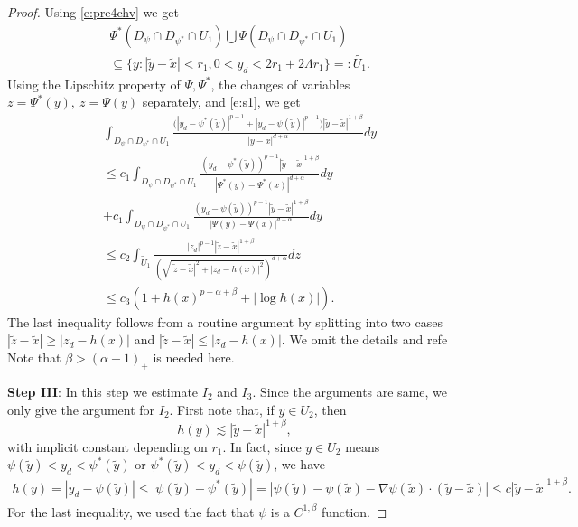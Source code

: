 \documentclass[12pt,a4paper]{amsart}
\numberwithin{equation}{section}
\theoremstyle{plain}
\newcommand{\be}{\beta}
\newcommand{\wt}{\widetilde}
\newcommand{\1}{\mathbbm{1}}
\begin{document}
\begin{proof}
Using \eqref{e:pre4chv} we get
\begin{equation} \label{e:s1}
    \begin{aligned}
& \Psi^*(D_{\psi} \cap D_{\psi^*} \cap U_1) \bigcup \Psi(D_{\psi} \cap D_{\psi^*} \cap U_1) \\
& \subseteq \{y: |\wt y -\wt x|<r_1, 0< y_d < 2r_1 + 2\Lambda r_1\}=: \wt{U_1}.
\end{aligned}
\end{equation}
Using the Lipschitz property of $\Psi, \Psi^*$, the changes of variables $z = \Psi^*(y),\ z = \Psi(y)$ separately, and \eqref{e:s1}, we get
\begin{align*}
& \int_{D_{\psi} \cap D_{\psi^*} \cap U_1} \frac{\big(|y_d - \psi^*(\wt y)|^{p-1} + |y_d - \psi(\wt y)|^{p-1} \big)|\wt y - \wt x|^{1+\beta}}{|y-x|^{d+\alpha}}dy \\
& \le c_1\int_{D_{\psi} \cap D_{\psi^*} \cap U_1} \frac{(y_d - \psi^*(\wt y))^{p-1}|\wt y - \wt x|^{1+\beta}}{|\Psi^*(y)-\Psi^*(x)|^{d+\alpha}}dy  \\
& + c_1 \int_{D_{\psi} \cap D_{\psi^*} \cap U_1} \frac{(y_d - \psi(\wt y))^{p-1}|\wt y - \wt x|^{1+\beta}}{|\Psi(y)-\Psi(x)|^{d+\alpha}}dy  \\
& \le c_2 \int_{\wt U_1} \frac{|z_d|^{p-1} |\wt z - \wt x|^{1+\beta}}{(\sqrt{|\wt z - \wt x|^2 + |z_d - h(x)|^2})^{d+\alpha}} dz \\
& \le c_3 \left(1 + h(x)^{p-\alpha + \beta} + |\log h(x)| \right).
\end{align*}
The last inequality follows from a routine argument by splitting into two cases $|\wt z - \wt x| \ge |z_d - h(x)|$ and $|\wt z - \wt x| \le |z_d - h(x)|$. We omit the details and refe
Note that $\beta > (\alpha - 1)_+$ is needed here. 

\noindent \textbf{Step III}: In this step we estimate $I_2$ and $I_3$. Since the arguments are same, we only give the argument for $I_2$. 
First note that, if $y \in U_2$, then
\begin{equation}\label{U2 fact 1}
h(y) \lesssim  |\wt y-\wt x|^{1+\be},
\end{equation}
with implicit constant depending on $r_1$. In fact, since  $y \in U_2$ means $\psi(\wt y) < y_d < \psi^*(\wt y)$ or $\psi^*(\wt y) < y_d <\psi(\wt y)$, we have 
\begin{align*}
h(y) = |y_d -\psi(\wt y)| \le |\psi(\wt y) - \psi^*(\wt y)| = |\psi(\wt y) -\psi(\wt x) - \nabla \psi(\wt x)\cdot (\wt y - \wt x)| \le c |\wt y - \wt x|^{1+\be}.
\end{align*}
For the last inequality, we used the fact that $\psi$ is a $C^{1,\be}$ function.  


\end{proof}
\end{document}
